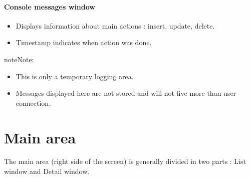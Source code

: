\documentclass[letterpaper,10pt,english]{sphinxmanual}
\begin{document}
\paragraph{Console messages window}
\begin{itemize}
\item {} 
Displays information about main actions : insert, update, delete.

\item {} 
Timestamp indicates when action was done.

\end{itemize}
\begin{figure}[htbp]
\centering

\end{figure}

\begin{notice}{note}{Note:}\begin{itemize}
\item {} 
This is only a temporary logging area.

\item {} 
Messages displayed here are not stored and will not live more than user connection.

\end{itemize}
\end{notice}
\newpage

\section{Main area}
\label{Gui:main-area}
The main area (right side of the screen) is generally divided in two parts : List window and Detail window.
\end{document}
